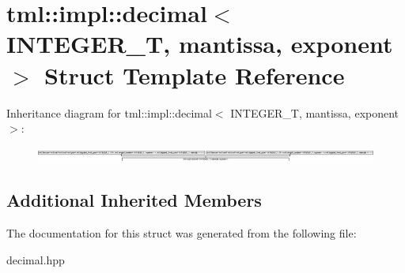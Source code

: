 \hypertarget{structtml_1_1impl_1_1decimal}{\section{tml\+:\+:impl\+:\+:decimal$<$ I\+N\+T\+E\+G\+E\+R\+\_\+\+T, mantissa, exponent $>$ Struct Template Reference}
\label{structtml_1_1impl_1_1decimal}
}
Inheritance diagram for tml\+:\+:impl\+:\+:decimal$<$ I\+N\+T\+E\+G\+E\+R\+\_\+\+T, mantissa, exponent $>$\+:\begin{figure}[H]
\begin{center}
\leavevmode
\includegraphics[height=0.496454cm]{structtml_1_1impl_1_1decimal}
\end{center}
\end{figure}
\subsection*{Additional Inherited Members}


The documentation for this struct was generated from the following file\+:\begin{DoxyCompactItemize}
\item 
decimal.\+hpp\end{DoxyCompactItemize}
